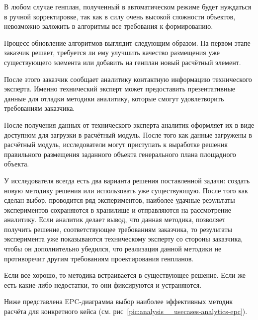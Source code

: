 В любом случае генплан, полученный в автоматическом режиме будет нуждаться в ручной корректировке,
так как в силу очень высокой сложности объектов, невозможно заложить в алгоритмы все требования к формированию.

Процесс обновление алгоритмов выглядит следующим образом.
На первом этапе заказчик решает, требуется ли ему улучшить качество размещения уже существующего элемента
или добавить на генплан новый расчётный элемент.

После этого заказчик сообщает аналитику контактную информацию технического эксперта.
Именно технический эксперт может предоставить презентативные данные для отладки методики аналитику,
которые смогут удовлетворить требованиям заказчика.

После получения данных от технического эксперта аналитик оформляет их в виде доступном для загрузки в расчётный модуль.
После того как данные загружены в расчётный модуль, исследователи могут приступать к выработке решения
правильного размещения заданного объекта генерального плана площадного объекта.

У исследователя всегда есть два варианта решения поставленной задачи: создать новую методику решения
или использовать уже существующую.
После того как сделан выбор, проводится ряд экспериментов,
наиболее удачные результаты экспериментов сохраняются в хранилище и отправляются на рассмотрение аналитику.
Если аналитик делает вывод, что данная методика, позволяет получить решение, соответствующее требованиям
заказчика, то результаты эксперимента уже показываются техническому эксперту со стороны заказчика,
чтобы он дополнительно убедился, что реализация данной методики не противоречит другим требованиям
проектирования генпланов.

Если все хорошо, то методика встраивается в существующее решение.
Если же есть какие-либо недостатки, то они фиксируются и устраняются.

Ниже представлена EPC-диаграмма выбор наиболее эффективных методик расчёта для конкретного кейса
(см. рис\ \ref{pic:analysis__usecases-analytics-epc}).

